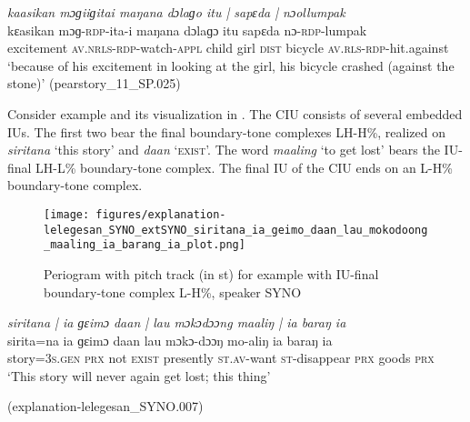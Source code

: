 \ea
\label{ex:kaasikan nogiigitai mangana dolago itu sapedana nollumpak}
\textit{kaasikan mɔɡiiɡitai maŋana dɔlaɡo itu | sapɛda  | nɔollumpak} \\
\gll kɛasikan mɔɡ-\textsc{rdp}-ita-i maŋana dɔlaɡɔ itu sapɛda nɔ-\textsc{rdp}-lumpak \\
excitement \textsc{av.nrls}-\textsc{rdp}-watch-\textsc{appl} child girl \textsc{dist} bicycle \textsc{av.rls}-\textsc{rdp}-hit.against\\
\glt ‘because of his excitement in looking at the girl, his bicycle crashed (against the stone)’ \hfill(pearstory\_11\_SP.025)
\z

Consider example  and its visualization in  . The CIU  consists of several embedded IUs.  The first two bear the final  boundary-tone complexes LH-H\%, realized on \textit{siritana} `this story' and \textit{daan} `\textsc{exist}'. The word \textit{maaling} `to get lost' bears the IU-final LH-L\% boundary-tone  complex.  The final IU of the CIU ends on an  L-H\% boundary-tone complex. 

\newpage
\begin{figure}
	\texttt{[image: figures/explanation-lelegesan\_SYNO\_extSYNO\_siritana\_ia\_geimo\_daan\_lau\_mokodoong\_maaling\_ia\_barang\_ia\_plot.png]}
	\caption{Periogram with pitch track (in st) for example  with IU-final boundary-tone complex L-H\%, speaker SYNO}
	\label{pitch:siritana ia geimo daan lau mokodoong maaling ia barang ia}
\end{figure}



\ea
\label{ex:siritana ia geimo daan lau mokodoong maaling ia barang ia}
\textit{siritana | ia ɡɛimɔ daan | lau mɔkɔdɔɔng maaliŋ | ia baraŋ ia} \\
\gll sirita=na ia ɡɛimɔ daan lau mɔkɔ-dɔɔŋ mo-aliŋ ia baraŋ ia \\
story=3\textsc{s}.\textsc{gen} \textsc{prx} not \textsc{exist} presently \textsc{st.av}-want \textsc{st}-disappear \textsc{prx} goods \textsc{prx}\\
\glt ‘This story will never again get lost; this thing’ \begin{flushright}(explanation-lelegesan\_SYNO.007)
	\end{flushright}
\z


